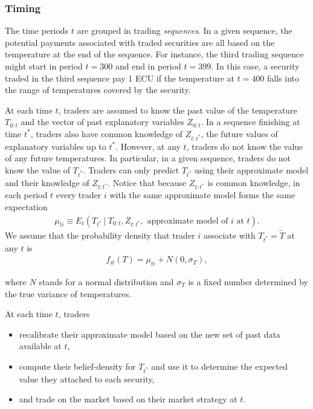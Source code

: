 \documentclass{sig-alternate}
\begin{document}
	\subsubsection*{Timing}
	
	The time periods $t$ are grouped in trading \emph{sequences}. In a given sequence, the potential payments associated with traded securities are all based on the temperature at the end of the sequence. For instance, the third trading sequence might start in period $t=300$ and end in period $t = 399$. In this case, a security traded in the third sequence pay 1 ECU if the temperature at $t=400$ falls into the range of temperatures covered by the security. 
	
	   At each time $t$, traders are assumed to know the past value of the temperature $T_{0:t}$ and the vector of past explanatory variables $Z_{0:t}$. In a sequence finishing at time $t^*$,  traders also have common knowledge of $Z_{t:t^*}$, the future values of explanatory variables up to $t^*$. However, at any $t$, traders do not know the value of any future temperatures. In particular, in a given sequence, traders do not know the value of $T_{t^*}$. Traders can only predict $T_{t^*}$ using their approximate model and their knowledge of $Z_{t:t^*}$. Notice that because $Z_{t:t^*}$ is common knowledge, in each period $t$ every trader $i$ with the same approximate model forms the same expectation 
	   \begin{align*}
	  \mu_{ti} \equiv E_t( T_{t^*} ~|~ T_{0:t}, Z_{t:t^*},  \text{ approximate model of } i \text { at } t).
	   \end{align*}
	   We assume that the probability density that trader $i$ associate with $T_{t^*} = \tilde{T}$ at any $t$ is
	   \begin{align*}
	   f_{it}(T) = \mu_{ti} + N(0, \sigma_T),
	   \end{align*}
	   
	   where $N$ stands for a normal distribution and $\sigma_T$ is a fixed number determined by the true variance of temperatures.       
	   
	    At each time $t$, traders
	\begin{itemize}
		\setlength\itemsep{0em}
		\item recalibrate their approximate model based on the new set of past data available at $t$,
		\item compute their belief-density for $T_{t^*}$ and use it to determine the expected value they attached to each security,
		\item and trade on the market based on their market strategy at $t$.
	\end{itemize}
	
\end{document}
